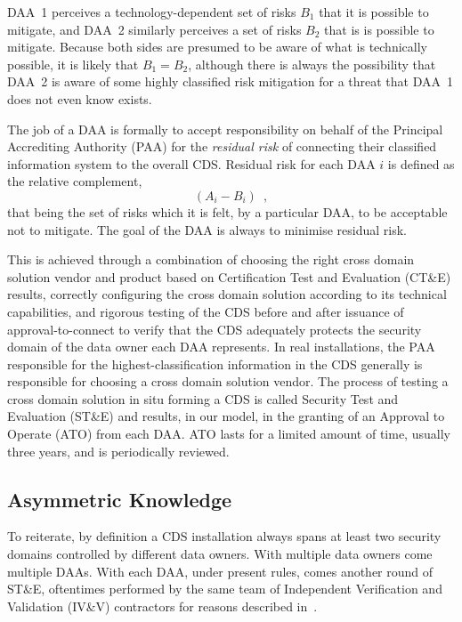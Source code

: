 \documentclass{llncs}
\begin{document}
DAA~1 perceives a technology-dependent set of risks $B_1$ that it is
possible to mitigate, and DAA~2 similarly perceives a set of risks $B_2$
that is is possible to mitigate.
Because both sides are presumed to be aware of what is technically
possible, it is likely that $B_1 = B_2$, although there is always the
possibility that DAA~2 is aware of some highly classified risk mitigation
for a threat that DAA~1 does not even know exists.

The job of a DAA
is formally to accept responsibility on behalf of the Principal Accrediting
Authority (PAA) for the \emph{residual risk} of connecting their classified information system
to the overall CDS.  Residual risk for each DAA $i$ is defined as the relative complement,
\begin{equation}\label{equation:individual-residual-risk}
\left(A_i-B_i\right)\enspace,
\end{equation}
that being the set of risks which it is felt, by a particular DAA,
to be acceptable not to mitigate.  The goal of the DAA is always to minimise residual risk.

This is achieved through a combination of choosing the right cross domain solution
vendor and product based on Certification Test and Evaluation (CT\&E) results,
correctly configuring the cross domain solution according
to its technical capabilities, and rigorous testing of the CDS before and
after issuance of approval-to-connect to verify that the CDS adequately protects
the security domain of the data owner each DAA represents.  In real installations,
the PAA responsible for the highest-classification information in the CDS generally is
responsible for choosing a cross domain solution vendor.  The process of testing a
cross domain solution in situ forming a CDS
is called Security Test and Evaluation (ST\&E) and results,
in our model, in the granting of an Approval
to Operate (ATO) from each DAA.  ATO lasts for a limited amount
of time, usually three years, and is periodically reviewed.

\subsection{Asymmetric Knowledge}

To reiterate, by definition a CDS installation always
spans at least two security domains controlled by different data owners.
With multiple data owners come multiple DAAs.  With each DAA, under present rules, comes
another round of ST\&E, oftentimes performed by the same team of Independent
Verification and Validation (IV\&V) contractors for reasons
described in~\cite{Loughry2010a}.
\end{document}
